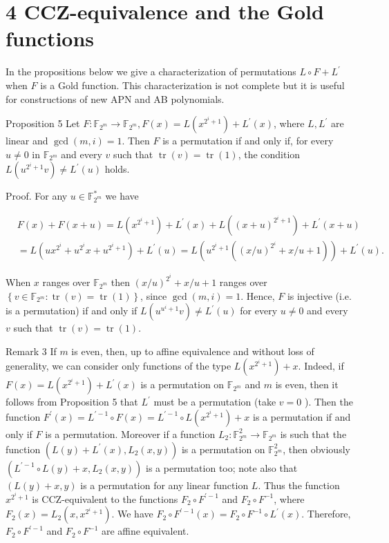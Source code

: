 \documentclass[10pt]{article}
\begin{document}
\section*{4 CCZ-equivalence and the Gold functions}
In the propositions below we give a characterization of permutations $L \circ F+L^{\prime}$ when $F$ is a Gold function. This characterization is not complete but it is useful for constructions of new APN and AB polynomials.

Proposition 5 Let $F: \mathbb{F}_{2^{m}} \rightarrow \mathbb{F}_{2^{m}}, F(x)=L\left(x^{2^{i}+1}\right)+L^{\prime}(x)$, where $L, L^{\prime}$ are linear and $\operatorname{gcd}(m, i)=1$. Then $F$ is a permutation if and only if, for every $u \neq 0$ in $\mathbb{F}_{2^{m}}$ and every $v$ such that $\operatorname{tr}(v)=\operatorname{tr}(1)$, the condition $L\left(u^{2^{i}+1} v\right) \neq L^{\prime}(u)$ holds.

Proof. For any $u \in \mathbb{F}_{2^{m}}^{*}$ we have

$$
\begin{aligned}
& F(x)+F(x+u)=L\left(x^{2^{i}+1}\right)+L^{\prime}(x)+L\left((x+u)^{2^{i}+1}\right)+L^{\prime}(x+u) \\
& =L\left(u x^{2^{i}}+u^{2^{i}} x+u^{2^{i}+1}\right)+L^{\prime}(u)=L\left(u^{2^{i}+1}\left((x / u)^{2^{i}}+x / u+1\right)\right)+L^{\prime}(u) .
\end{aligned}
$$

When $x$ ranges over $\mathbb{F}_{2^{m}}$ then $(x / u)^{2^{i}}+x / u+1$ ranges over $\left\{v \in \mathbb{F}_{2^{m}}: \operatorname{tr}(v)=\operatorname{tr}(1)\right\}$, since $\operatorname{gcd}(m, i)=1$. Hence, $F$ is injective (i.e. is a permutation) if and only if $L\left(u^{u^{i}+1} v\right) \neq L^{\prime}(u)$ for every $u \neq 0$ and every $v$ such that $\operatorname{tr}(v)=\operatorname{tr}(1)$.

Remark 3 If $m$ is even, then, up to affine equivalence and without loss of generality, we can consider only functions of the type $L\left(x^{2^{i}+1}\right)+x$. Indeed, if $F(x)=L\left(x^{2^{i}+1}\right)+L^{\prime}(x)$ is a permutation on $\mathbb{F}_{2^{m}}$ and $m$ is even, then it follows from Proposition 5 that $L^{\prime}$ must be a permutation (take $v=0$ ). Then the function $F^{\prime}(x)=L^{\prime-1} \circ F(x)=L^{\prime-1} \circ L\left(x^{2^{i}+1}\right)+x$ is a permutation if and only if $F$ is a permutation. Moreover if a function $L_{2}: \mathbb{F}_{2^{m}}^{2} \rightarrow \mathbb{F}_{2^{m}}$ is such that the function $\left(L(y)+L^{\prime}(x), L_{2}(x, y)\right)$ is a permutation on $\mathbb{F}_{2^{m}}^{2}$, then obviously $\left(L^{\prime-1} \circ L(y)+x, L_{2}(x, y)\right)$ is a permutation too; note also that $(L(y)+x, y)$ is a permutation for any linear function $L$. Thus the function $x^{2^{i}+1}$ is CCZ-equivalent to the functions $F_{2} \circ F^{\prime-1}$ and $F_{2} \circ F^{-1}$, where $F_{2}(x)=L_{2}\left(x, x^{2^{i}+1}\right)$. We have $F_{2} \circ F^{\prime-1}(x)=F_{2} \circ F^{-1} \circ L^{\prime}(x)$. Therefore, $F_{2} \circ F^{\prime-1}$ and $F_{2} \circ F^{-1}$ are affine equivalent.
\end{document}

